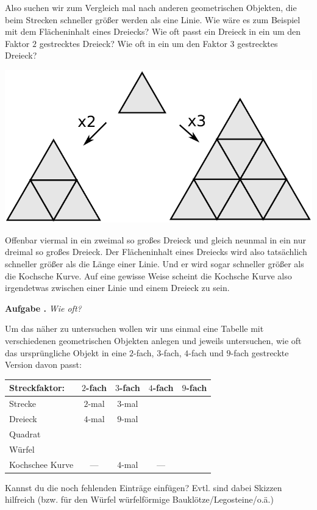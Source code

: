 \documentclass[a4paper,ngerman,12pt]{scrartcl}
\theoremstyle{definition}
\theoremstyle{plain}
\theoremstyle{remark}
\newlength{\aufgabenskip}
\newcounter{aufgabennummer}
\newenvironment{aufgabe}[1]{
  \addtocounter{aufgabennummer}{1}
  \textbf{Aufgabe \theaufgabennummer.} \emph{#1} \par
}{\vspace{\aufgabenskip}}
\begin{document}
Also suchen wir zum Vergleich mal nach anderen geometrischen Objekten, die beim Strecken schneller größer werden als eine Linie. Wie wäre es zum Beispiel mit dem Flächeninhalt eines Dreiecks? Wie oft passt ein Dreieck in ein um den Faktor $2$ gestrecktes Dreieck? Wie oft in ein um den Faktor $3$ gestrecktes Dreieck?
\begin{center}
	\includegraphics[width=.4\textwidth]{Bilder/Dreieck_vergroessern.pdf}
\end{center}
Offenbar viermal in ein zweimal so großes Dreieck und gleich neunmal in ein nur dreimal so großes Dreieck. Der Flächeninhalt eines Dreiecks wird also tatsächlich schneller größer als die Länge einer Linie. Und er wird sogar schneller größer als die Kochsche Kurve. Auf eine gewisse Weise scheint die Kochsche Kurve also irgendetwas zwischen einer Linie und einem Dreieck zu sein.

\begin{aufgabe}{Wie oft?}\label{aufgabe:Wie_oft}
Um das näher zu untersuchen wollen wir uns einmal eine Tabelle mit verschiedenen geometrischen Objekten anlegen und jeweils untersuchen, wie oft das ursprüngliche Objekt in eine $2$-fach, $3$-fach, $4$-fach und $9$-fach gestreckte Version davon passt:
\begin{center}
	\renewcommand{\arraystretch}{2}
	\begin{tabular}{l||c|c|c|c}
		Streckfaktor:& $2$-fach & $3$-fach & $4$-fach & $9$-fach \\\hline\hline
		Strecke      & $2$-mal	& $3$-mal  &          &			 \\\hline
		Dreieck      & $4$-mal  & $9$-mal  &          &          \\\hline
		Quadrat      &          &          &          &          \\\hline
		Würfel       &          &          &          &          \\\hline
		Kochschee Kurve & ---   & $4$-mal  & ---      &          \\      	
	\end{tabular}
\end{center}
Kannst du die noch fehlenden Einträge einfügen? Evtl. sind dabei Skizzen hilfreich (bzw. für den Würfel würfelförmige Bauklötze/Legosteine/o.ä.)
\end{aufgabe}
\end{document}
